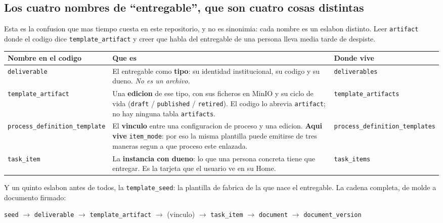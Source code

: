 \documentclass[11pt,a4paper,oneside]{report}
\newcommand{\rt}[1]{\texttt{#1}}
\begin{document}
\subsection{Los cuatro nombres de ``entregable'', que son cuatro cosas distintas}

Esta es la confusion que mas tiempo cuesta en este repositorio, y no es sinonimia: cada nombre es
un eslabon distinto. Leer \rt{artifact} donde el codigo dice \rt{template\_artifact} y creer que
habla del entregable de una persona lleva media tarde de despiste.

\begin{center}
\footnotesize
\begin{tabularx}{\textwidth}{@{}P{4.6cm}LP{3.4cm}@{}}
\toprule
\textbf{Nombre en el codigo} & \textbf{Que es} & \textbf{Donde vive} \\
\midrule
\rt{deliverable} &
  El entregable como \textbf{tipo}: su identidad institucional, su codigo y su dueno.
  \emph{No es un archivo.} &
  \rt{deliverables} \\
\rt{template\_artifact} &
  Una \textbf{edicion} de ese tipo, con sus ficheros en MinIO y su ciclo de vida
  (\rt{draft} / \rt{published} / \rt{retired}). El codigo lo abrevia \rt{artifact}; no hay
  ninguna tabla \rt{artifacts}. &
  \rt{template\_artifacts} \\
\rt{process\_definition\_template} &
  El \textbf{vinculo} entre una configuracion de proceso y una edicion. \textbf{Aqui vive}
  \rt{item\_mode}: por eso la misma plantilla puede emitirse de tres maneras segun a que
  proceso este enlazada. &
  \rt{process\_definition\_templates} \\
\rt{task\_item} &
  La \textbf{instancia con dueno}: lo que una persona concreta tiene que entregar. Es la
  tarjeta que el usuario ve en su Home. &
  \rt{task\_items} \\
\bottomrule
\end{tabularx}
\end{center}

Y un quinto eslabon antes de todos, la \rt{template\_seed}: la plantilla de fabrica de la que
nace el entregable. La cadena completa, de molde a documento firmado:

\begin{center}
\rt{seed} $\to$ \rt{deliverable} $\to$ \rt{template\_artifact} $\to$ (vinculo) $\to$
\rt{task\_item} $\to$ \rt{document} $\to$ \rt{document\_version}
\end{center}
\end{document}
